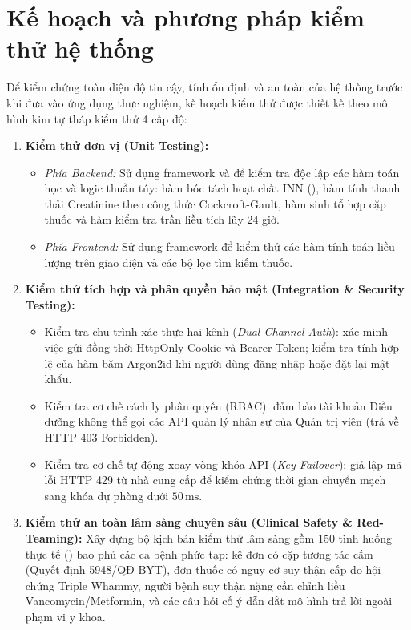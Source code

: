 \section{Kế hoạch và phương pháp kiểm thử hệ thống}
\label{sec:testing_plan_methodology}

Để kiểm chứng toàn diện độ tin cậy, tính ổn định và an toàn của hệ thống trước khi đưa vào ứng dụng thực nghiệm, kế hoạch kiểm thử được thiết kế theo mô hình kim tự tháp kiểm thử 4 cấp độ:

\begin{enumerate}[leftmargin=2em]
    \item \textbf{Kiểm thử đơn vị (Unit Testing):}
    \begin{itemize}[leftmargin=1.5em]
        \item \textit{Phía Backend:} Sử dụng framework  và  để kiểm tra độc lập các hàm toán học và logic thuần túy: hàm bóc tách hoạt chất INN (), hàm tính thanh thải Creatinine theo công thức Cockcroft-Gault, hàm sinh tổ hợp cặp thuốc và hàm kiểm tra trần liều tích lũy 24 giờ.
        \item \textit{Phía Frontend:} Sử dụng framework  để kiểm thử các hàm tính toán liều lượng trên giao diện và các bộ lọc tìm kiếm thuốc.
    \end{itemize}

    \item \textbf{Kiểm thử tích hợp và phân quyền bảo mật (Integration \& Security Testing):}
    \begin{itemize}[leftmargin=1.5em]
        \item Kiểm tra chu trình xác thực hai kênh (\textit{Dual-Channel Auth}): xác minh việc gửi đồng thời HttpOnly Cookie và Bearer Token; kiểm tra tính hợp lệ của hàm băm Argon2id khi người dùng đăng nhập hoặc đặt lại mật khẩu.
        \item Kiểm tra cơ chế cách ly phân quyền (RBAC): đảm bảo tài khoản Điều dưỡng không thể gọi các API quản lý nhân sự của Quản trị viên (trả về HTTP 403 Forbidden).
        \item Kiểm tra cơ chế tự động xoay vòng khóa API (\textit{Key Failover}): giả lập mã lỗi HTTP 429 từ nhà cung cấp để kiểm chứng thời gian chuyển mạch sang khóa dự phòng dưới $50\,\text{ms}$.
    \end{itemize}

    \item \textbf{Kiểm thử an toàn lâm sàng chuyên sâu (Clinical Safety \& Red-Teaming):}
    Xây dựng bộ kịch bản kiểm thử lâm sàng gồm 150 tình huống thực tế () bao phủ các ca bệnh phức tạp: kê đơn có cặp tương tác cấm (Quyết định 5948/QĐ-BYT), đơn thuốc có nguy cơ suy thận cấp do hội chứng Triple Whammy, người bệnh suy thận nặng cần chỉnh liều Vancomycin/Metformin, và các câu hỏi cố ý dẫn dắt mô hình trả lời ngoài phạm vi y khoa.


\end{enumerate}
